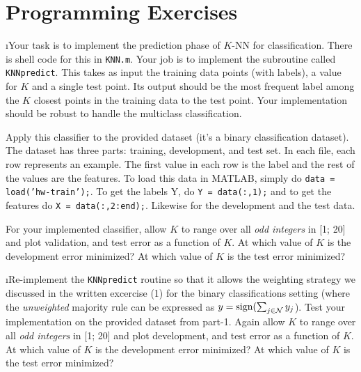 \documentclass[fleqn]{article}
\begin{document}
\ene

\section{Programming Exercises}

\bee

\i Your task is to implement the prediction phase of $K$-NN for classification. 
There is shell code for this in \texttt{KNN.m}. Your job is to implement the 
subroutine called \texttt{KNNpredict}. This takes as input the training data 
points (with labels), a value for $K$ and a single test point. Its output 
should be the most frequent label among the $K$ closest points in the training 
data to the test point. Your implementation should be robust to handle the 
multiclass classification.

Apply this classifier to the provided dataset (it's a binary classification dataset). 
The dataset has three parts: training, development, and test set. In each file, each
row represents an example. The first value in each row is the label and the rest of the 
values are the features. To load this data in MATLAB, simply do \texttt{data = 
load('hw-train');}. To get the labels Y, do \texttt{Y = data(:,1);} and to get the 
features do \texttt{X = data(:,2:end);}. Likewise for the development and the test data.

For your implemented classifier, allow $K$ to range over all \textit{odd integers} 
in [1; 20] and plot validation, and test error as a function of $K$. At which 
value of $K$ is the development error minimized? At which value of $K$ is the test 
error minimized?

\i Re-implement the \texttt{KNNpredict} routine so that it allows the weighting strategy 
we discussed in the written excercise (1) for the binary classifications setting
(where the \textit{unweighted} majority rule can be expressed as $y = \textrm{sign}(\sum_{j 
\in \mathcal{N}} y_j$). Test your implementation on the provided dataset from part-1. 
Again allow $K$ to range over all \textit{odd integers} in [1; 20] and plot development, 
and test error as a function of $K$. At which value of $K$ is the development error 
minimized? At which value of $K$ is the test error minimized?

\ene
\end{document}
